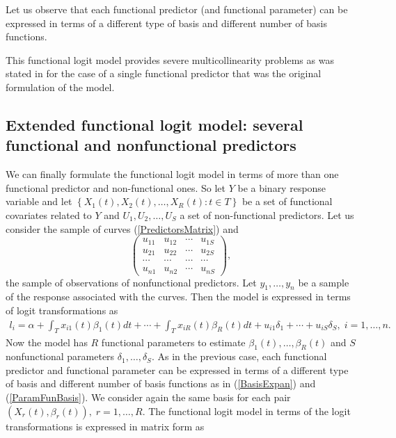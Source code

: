 Let us observe that each functional predictor (and functional parameter) can be expressed in terms of a different type of basis and different number of basis functions.

This functional logit model provides severe multicollinearity problems as was stated in \cite{Escabias04} for the case of a single functional predictor that was the original formulation of the model.

\subsection{Extended functional logit model: several functional and nonfunctional predictors}

We can finally formulate the functional logit model in terms of more than one functional predictor and non-functional ones. So let $Y$ be a binary response variable and let $\left\{X_1\left( t\right),X_2\left( t\right),\ldots,X_R\left( t\right): t\in T\right\} $ be a set of functional covariates related to $Y$ and $U_1,U_2,\ldots,U_S$ a set of non-functional predictors. Let us consider the sample of curves (\ref{PredictorsMatrix}) and
\begin{equation*}
\left( 
\begin{array}{cccc}
u_{11} & u_{12} & \cdots & u_{1S} \\ 
u_{21} & u_{22} & \cdots & u_{2S} \\ 
\cdots & \cdots & \cdots & \cdots \\ 
u_{n1} & u_{n2} & \cdots & u_{nS}
\end{array}
\right),
\end{equation*}
the sample of observations of nonfunctional predictors. Let $y_{1},\ldots,y_{n}$ be a sample of the response associated with the curves. Then the model is expressed in terms of logit transformations as
\begin{eqnarray}
l_i =\alpha
+\int_{T}x_{i1}\left( t\right) \beta_1 \left( t\right) dt+\cdots+\int_{T}x_{iR}\left( t\right) \beta_R \left( t\right) dt + u_{i1} \delta_1+\cdots+u_{iS} \delta_S,\; i=1,\ldots ,n.
\label{pclogitfun2}
\end{eqnarray}
Now the model has $R$ functional parameters to estimate $\beta_1\left( t\right),\ldots,\beta_R \left( t\right)$ and $S$ nonfunctional parameters $\delta_1,\ldots,\delta_S.$ As in the previous case, each functional predictor and functional parameter can be expressed in terms of a different type of basis and different number of basis functions as in (\ref{BasisExpan}) and (\ref{ParamFunBasis}). We consider again the same basis for each pair $(X_r(t),\beta_r(t)), \; r=1,\ldots,R.$ The functional logit model in terms of the logit transformations is expressed in matrix form as
